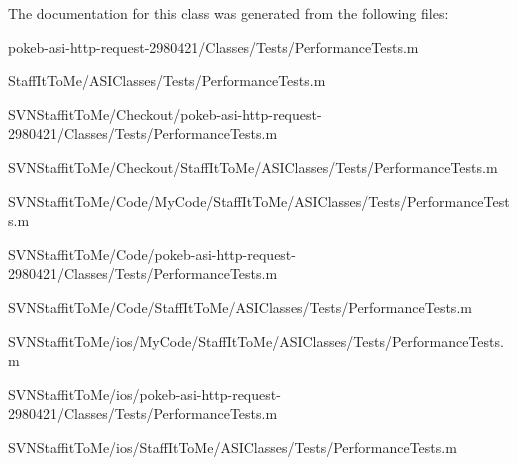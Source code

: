 \-The documentation for this class was generated from the following files\-:\begin{DoxyCompactItemize}
\item 
pokeb-\/asi-\/http-\/request-\/2980421/\-Classes/\-Tests/\-Performance\-Tests.\-m\item 
\-Staff\-It\-To\-Me/\-A\-S\-I\-Classes/\-Tests/\-Performance\-Tests.\-m\item 
\-S\-V\-N\-Staffit\-To\-Me/\-Checkout/pokeb-\/asi-\/http-\/request-\/2980421/\-Classes/\-Tests/\-Performance\-Tests.\-m\item 
\-S\-V\-N\-Staffit\-To\-Me/\-Checkout/\-Staff\-It\-To\-Me/\-A\-S\-I\-Classes/\-Tests/\-Performance\-Tests.\-m\item 
\-S\-V\-N\-Staffit\-To\-Me/\-Code/\-My\-Code/\-Staff\-It\-To\-Me/\-A\-S\-I\-Classes/\-Tests/\-Performance\-Tests.\-m\item 
\-S\-V\-N\-Staffit\-To\-Me/\-Code/pokeb-\/asi-\/http-\/request-\/2980421/\-Classes/\-Tests/\-Performance\-Tests.\-m\item 
\-S\-V\-N\-Staffit\-To\-Me/\-Code/\-Staff\-It\-To\-Me/\-A\-S\-I\-Classes/\-Tests/\-Performance\-Tests.\-m\item 
\-S\-V\-N\-Staffit\-To\-Me/ios/\-My\-Code/\-Staff\-It\-To\-Me/\-A\-S\-I\-Classes/\-Tests/\-Performance\-Tests.\-m\item 
\-S\-V\-N\-Staffit\-To\-Me/ios/pokeb-\/asi-\/http-\/request-\/2980421/\-Classes/\-Tests/\-Performance\-Tests.\-m\item 
\-S\-V\-N\-Staffit\-To\-Me/ios/\-Staff\-It\-To\-Me/\-A\-S\-I\-Classes/\-Tests/\-Performance\-Tests.\-m\end{DoxyCompactItemize}

